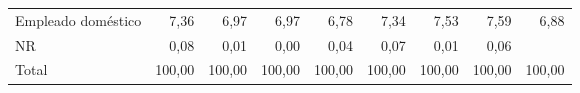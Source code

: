 \begin{tabular}{lllllllll}
\multicolumn{1}{l}{\hspace{1em}Empleado doméstico} &
  \multicolumn{1}{|r}{7,36} &
  \multicolumn{1}{r}{6,97} &
  \multicolumn{1}{r}{6,97} &
  \multicolumn{1}{r}{6,78} &
  \multicolumn{1}{r}{7,34} &
  \multicolumn{1}{r}{7,53} &
  \multicolumn{1}{r}{7,59} &
  \multicolumn{1}{r}{6,88} \\
\multicolumn{1}{l}{\hspace{1em}NR} &
  \multicolumn{1}{|r}{0,08} &
  \multicolumn{1}{r}{0,01} &
  \multicolumn{1}{r}{0,00} &
  \multicolumn{1}{r}{0,04} &
  \multicolumn{1}{r}{0,07} &
  \multicolumn{1}{r}{0,01} &
  \multicolumn{1}{r}{0,06} &
  \multicolumn{1}{r}{} \\
\multicolumn{1}{l}{\hspace{1em}Total} &
  \multicolumn{1}{|r}{100,00} &
  \multicolumn{1}{r}{100,00} &
  \multicolumn{1}{r}{100,00} &
  \multicolumn{1}{r}{100,00} &
  \multicolumn{1}{r}{100,00} &
  \multicolumn{1}{r}{100,00} &
  \multicolumn{1}{r}{100,00} &
  \multicolumn{1}{r}{100,00} \\
\cline{1-9}
\end{tabular}
